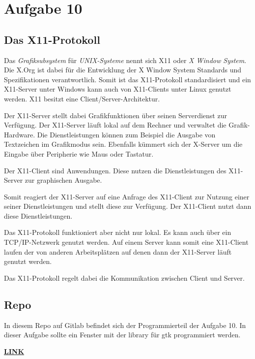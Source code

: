 \chapter{Aufgabe 10}
\section{Das X11-Protokoll}
Das \textit{Grafiksubsystem} für \textit{UNIX-Systeme} nennt sich X11 oder \textit{X Window System}.
Die X.Org ist dabei für die Entwicklung der X Window System Standards und Spezifikationen verantwortlich.
Somit ist das X11-Protokoll standardisiert und ein X11-Server unter Windows kann auch von X11-Clients unter Linux genutzt werden.
X11 besitzt eine Client/Server-Architektur.\par
Der X11-Server stellt dabei Grafikfunktionen über seinen Serverdienst zur Verfügung.
Der X11-Server läuft lokal auf dem Rechner und verwaltet die Grafik-Hardware.
Die Dienstleistungen können zum Beispiel die Ausgabe von Textzeichen im Grafikmodus sein.
Ebenfalls kümmert sich der X-Server um die Eingabe über Peripherie wie Maus oder Tastatur.\par
Der X11-Client sind Anwendungen.
Diese nutzen die Dienstleistungen des X11-Server zur graphischen Ausgabe. \par
Somit reagiert der X11-Server auf eine Anfrage des X11-Client zur Nutzung einer seiner Dienstleistungen und stellt diese zur Verfügung.
Der X11-Client nutzt dann diese Dienstleistungen. \par
Das X11-Protokoll funktioniert aber nicht nur lokal.
Es kann auch über ein TCP/IP-Netzwerk genutzt werden.
Auf einem Server kann somit eine X11-Client laufen der von anderen Arbeitsplätzen auf denen dann der X11-Server läuft genutzt werden.\par
Das X11-Protokoll regelt dabei die Kommunikation zwischen Client und Server\cite{xwindow:2023}\cite{x11:2012}.

\section{Repo}
In diesem Repo auf Gitlab befindet sich der Programmierteil der Aufgabe 10. In dieser Aufgabe sollte ein Fenster mit der library für gtk programmiert werden.\par
\href{https://gitlab.thga.de/daniel.krueger/pruefung_sose_2023_aufgabe_10_gui}{\textbf{LINK}}
